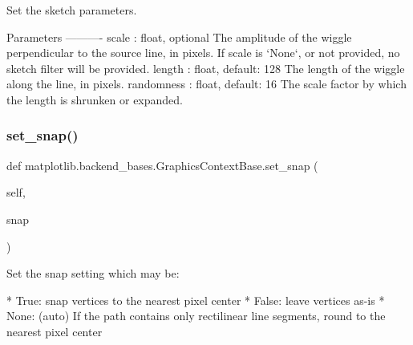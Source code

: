 \begin{DoxyVerb}Set the sketch parameters.

Parameters
----------
scale : float, optional
    The amplitude of the wiggle perpendicular to the source line, in
    pixels.  If scale is `None`, or not provided, no sketch filter will
    be provided.
length : float, default: 128
    The length of the wiggle along the line, in pixels.
randomness : float, default: 16
    The scale factor by which the length is shrunken or expanded.
\end{DoxyVerb}
 \mbox{\label{classmatplotlib_1_1backend__bases_1_1GraphicsContextBase_a619053752484321bb0e2c8fb17efd709}} 
\subsubsection{\texorpdfstring{set\+\_\+snap()}{set\_snap()}}
{\footnotesize\ttfamily def matplotlib.\+backend\+\_\+bases.\+Graphics\+Context\+Base.\+set\+\_\+snap (\begin{DoxyParamCaption}\item[{}]{self,  }\item[{}]{snap }\end{DoxyParamCaption})}

\begin{DoxyVerb}Set the snap setting which may be:

* True: snap vertices to the nearest pixel center
* False: leave vertices as-is
* None: (auto) If the path contains only rectilinear line segments,
  round to the nearest pixel center
\end{DoxyVerb}
 \mbox{\label{classmatplotlib_1_1backend__bases_1_1GraphicsContextBase_a43a2989f13293349c40e7810b8681ee2}} 
